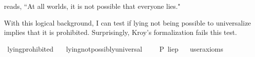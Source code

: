 \begin{isabellebody}
{reads, ``At all worlds, it is not possible that everyone lies."%
}%
\begin{isamarkuptext}%
With this logical background, I can test if lying not being possible to universalize implies 
that it is prohibited. Surprisingly, Kroy's formalization fails this test.%
\end{isamarkuptext}\isamarkuptrue%
\isamarkupfalse%
\ lying{\isacharunderscore}prohibited{\isacharcolon}\isanewline
\ \ \ {\isachardoublequoteopen}lying{\isacharunderscore}not{\isacharunderscore}possibly{\isacharunderscore}universal\ {\isasymlongrightarrow}\ \ {\isacharparenleft}\ {\isasymTurnstile}{\isacharparenleft}\isactrlbold {\isasymnot}\ P\ {\isacharbraceleft}lie{\isacharparenleft}p{\isacharparenright}{\isacharbraceright}{\isacharparenright}{\isacharparenright}{\isachardoublequoteclose}\isanewline
\ \ \isamarkupfalse%
{\isacharbrackleft}user{\isacharunderscore}axioms{\isacharbrackright}%
\isadelimproof
\ %
\endisadelimproof
%
\isatagproof
{}\isamarkupfalse%
\isanewline
%
\end{isabellebody}
